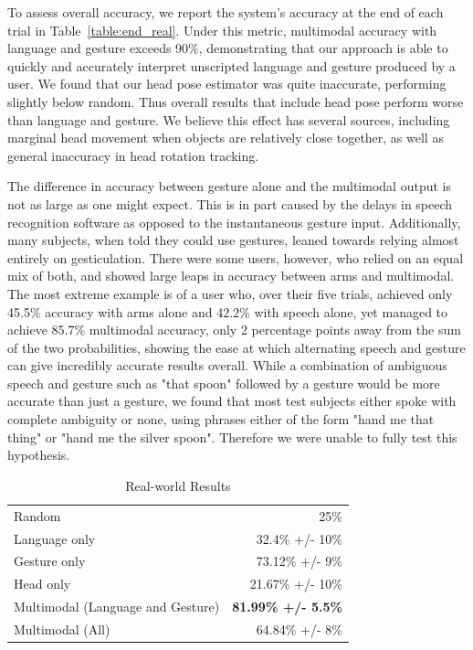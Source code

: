 \documentclass[a4paper, 11pt]{article} %
\begin{document}
To assess overall accuracy, we report the system's accuracy at the end
of each trial in Table~\ref{table:end_real}.  Under this metric, multimodal accuracy with language and gesture exceeds 90\%, demonstrating that our approach is able
to quickly and accurately interpret unscripted language and gesture
produced by a user.  We found that our head pose estimator was quite
inaccurate, performing slightly below random.  Thus overall
results that include head pose perform worse than language and
gesture.  We believe this effect has several sources, including marginal head movement when objects are relatively close together, as well as general inaccuracy in head rotation tracking. 

The difference in accuracy between gesture alone and the multimodal output is not as large as one might expect. This is in part caused by the delays in speech recognition software as opposed to the instantaneous gesture input. Additionally, many subjects, when told they could use gestures, leaned towards relying almost entirely on gesticulation. There were some users, however, who relied on an equal mix of both, and showed large leaps in accuracy between arms and multimodal. The most extreme example is of a user who, over their five trials, achieved only 45.5\% accuracy with arms alone and 42.2\% with speech alone, yet managed to achieve 85.7\% multimodal accuracy, only 2 percentage points away from the sum of the two probabilities, showing the ease at which alternating speech and gesture can give incredibly accurate results overall. While a combination of ambiguous speech and gesture such as "that spoon" followed by a gesture would be more accurate than just a gesture, we found that most test subjects either spoke with complete ambiguity or none, using phrases either of the form "hand me that thing" or "hand me the silver spoon". Therefore we were unable to fully test this hypothesis.
\begin{table}
\caption{Real-world Results\label{table:real_results}}
\centering
\begin{tabular}{lr}
\toprule
Random & 25\%\\
Language only &  32.4\% +/- 10\%\\
Gesture only  &  73.12\% +/- 9\%\\
Head only     &  21.67\% +/- 10\%\\
Multimodal (Language and Gesture) & {\bf 81.99\% +/- 5.5\%}\\
Multimodal (All) &  64.84\% +/- 8\%\\
\bottomrule
\end{tabular}
\end{table}
\end{document}
